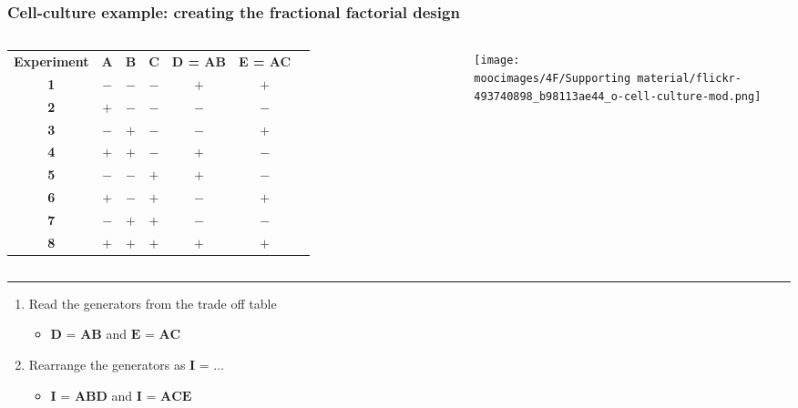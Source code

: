 \documentclass[handout,11pt,aspectratio=169,mathserif]{beamer}
\begin{document}
\begin{frame}\frametitle{Cell-culture example: creating the fractional factorial design}
	
	\vspace{0.5cm}
	\begin{columns}[T]
			{\scriptsize
				\begin{tabulary}{\linewidth}{ccccccc}
					\textbf{\relax Experiment} & \textbf{\relax A } & \textbf{\relax B} & \textbf{\relax C } & \textbf{\relax D = AB} & \textbf{\relax E = AC}\\ 
					\textbf{1} & \(-\) & \(-\) & \(-\) & \(+\) & \(+\) \\
					\textbf{2} & \(+\) & \(-\) & \(-\) & \(-\) & \(-\) \\
					\textbf{3} & \(-\) & \(+\) & \(-\) & \(-\) & \(+\) \\
					\textbf{4} & \(+\) & \(+\) & \(-\) & \(+\) & \(-\) \\
					\textbf{5} & \(-\) & \(-\) & \(+\) & \(+\) & \(-\) \\
					\textbf{6} & \(+\) & \(-\) & \(+\) & \(-\) & \(+\) \\
					\textbf{7} & \(-\) & \(+\) & \(+\) & \(-\) & \(-\) \\
					\textbf{8} & \(+\) & \(+\) & \(+\) & \(+\) & \(+\) \\
				\end{tabulary}
			}
		
			\vspace{-0.2cm}
			\centerline{\texttt{[image: \\moocimages/4F/Supporting material/flickr-493740898\_b98113ae44\_o-cell-culture-mod.png]} }
			
	\end{columns}
	
	\vspace{0.2cm}
	\hrule
	\begin{enumerate}
		\item	Read the generators from the trade off table 
			\begin{itemize}
				\item		$\textbf{D = AB}$  and $\textbf{E = AC}$ 
			\end{itemize}
		
		\item	Rearrange the generators as  $\textbf{I = \ldots}$
			\begin{itemize}
				\item	$\textbf{I = ABD}$ and $\textbf{I = ACE}$ 
			\end{itemize}
			

\end{enumerate}
\end{frame}
\end{document}

